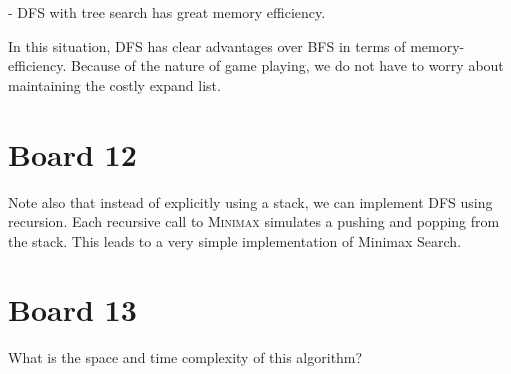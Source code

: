 \documentclass[11pt]{article}
\begin{document}
- DFS with tree search has great memory efficiency.

In this situation, DFS has clear advantages over BFS in terms of
memory-efficiency. Because of the nature of game playing, we do not
have to worry about maintaining the costly expand list.  


\section{Board 12}
Note also
that instead of explicitly using a stack, we can implement DFS using
recursion. Each recursive call to \textsc{Minimax} simulates a pushing
and popping from the stack. This leads to a very simple implementation
of Minimax Search.  \air

\begin{algorithm}[h]
\begin{algorithmic}[1]

  \EndFor{}
  \EndFor{}
  \EndIf{}
  \EndProcedure{}
\end{algorithmic}
\end{algorithm}



\section{Board 13}

\begin{exercise}
  What is the space and time complexity of this algorithm?
\end{exercise}

\end{document}
